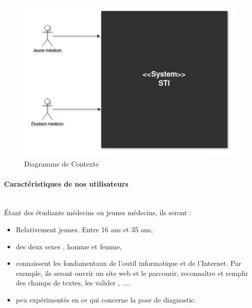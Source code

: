     \begin{figure}[H]
        \centering
        \includegraphics[width=\textwidth]{figures/context.png}
        \captionsetup{justification=centering}
        \caption{Diagramme de Contexte}
        \label{fig:uml_context}
    \end{figure}
    
    \paragraph{Caractéristiques de nos utilisateurs} \hfill \\
    Étant des étudiants médecins ou jeunes médecins, ils seront :
    \begin{itemize}
        \item Relativement jeunes. Entre 16 ans et 35 ans,
        \item des deux sexes , homme et femme,
        \item connaissent les fondamentaux de l'outil informatique et de l'Internet. Par exemple, ils seront ouvrir un site web et le parcourir, reconnaître et remplir des champs de textes, les valider , ....
        
        \item peu expérimentés en ce qui concerne la pose de diagnostic.
    \end{itemize}
    
